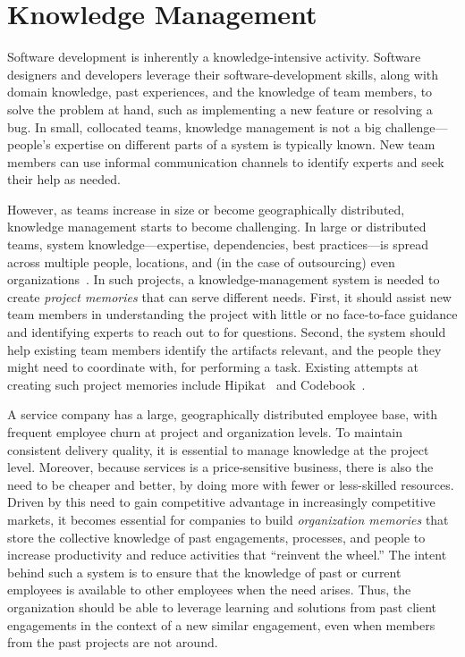 
\section{Knowledge Management}
\label{sec:km}

Software development is inherently a knowledge-intensive activity. Software
designers and developers leverage their software-development skills, along with
domain knowledge, past experiences, and the knowledge of team members, to solve
the problem at hand, such as implementing a new feature or resolving a bug.  In
small, collocated teams, knowledge management is not a big challenge---people's
expertise on different parts of a system is typically known. New team members
can use informal communication channels to identify experts and seek their help
as needed.

However, as teams increase in size or become geographically distributed,
knowledge management starts to become challenging. In large or distributed
teams, system knowledge---\eg expertise, dependencies, best practices---is
spread across multiple people, locations, and (in the case of outsourcing) even
organizations~\cite{Desouza:2006}. In such projects, a knowledge-management
system is needed to create \textit{project memories} that can serve different
needs. First, it should assist new team members in understanding the project
with little or no face-to-face guidance and identifying experts to reach out to
for questions. Second, the system should help existing team members identify the
artifacts relevant, and the people they might need to coordinate with, for
performing a task. Existing attempts at creating such project memories include
Hipikat~\cite{Murphy:2005} and Codebook~\cite{Begel:2010}.

A service company has a large, geographically distributed employee base, with
frequent employee churn at project and organization levels. To maintain
consistent delivery quality, it is essential to manage knowledge at the project
level. Moreover, because services is a price-sensitive business, there is also
the need to be cheaper and better, by doing more with fewer or less-skilled
resources. Driven by this need to gain competitive advantage in increasingly
competitive markets, it becomes essential for companies to build
\textit{organization memories} that store the collective knowledge of past
engagements, processes, and people to increase productivity and reduce
activities that ``reinvent the wheel.'' The intent behind such a system is to
ensure that the knowledge of past or current employees is available to other
employees when the need arises. Thus, the organization should be able to
leverage learning and solutions from past client engagements in the context of a
new similar engagement, even when members from the past projects are not around.

